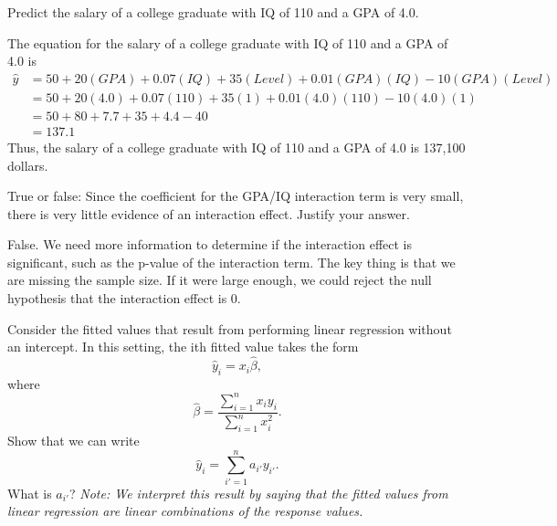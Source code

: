 \documentclass{article}
\begin{document}
\begin{probset}
\begin{prob}
\begin{subprobset}
        \begin{subprob}
            Predict the salary of a college graduate with IQ of 110 and a GPA of 4.0.

            \begin{soln}
                The equation for the salary of a college graduate with IQ of 110 and a GPA of 4.0 is
                \begin{align*}
                    \hat{y} &= 50 + 20(GPA) + 0.07(IQ) + 35(Level) + 0.01(GPA)(IQ) - 10(GPA)(Level) \\
                    &= 50 + 20(4.0) + 0.07(110) + 35(1) + 0.01(4.0)(110) - 10(4.0)(1) \\
                    &= 50 + 80 + 7.7 + 35 + 4.4 - 40 \\
                    &= 137.1
                \end{align*}
                Thus, the salary of a college graduate with IQ of 110 and a GPA of 4.0 is 137,100 dollars.
            \end{soln}
        \end{subprob}

        \begin{subprob}
            True or false: Since the coefficient for the GPA/IQ interaction term is very small, there is very little evidence of an interaction effect. Justify your answer.

            \begin{soln}
                False. We need more information to determine if the interaction effect is significant, such as the p-value of the interaction term. The key thing is that we are missing the sample size. If it were large enough, we could reject the null hypothesis that the interaction effect is 0.
            \end{soln}
        \end{subprob}
    \end{subprobset}
\end{prob}

\newpage

\begin{prob}
    Consider the fitted values that result from performing linear regression without an intercept. In this setting, the ith fitted value takes the form
    \[\hat{y}_i = x_i \hat{\beta},\]
    where
    \[\hat{\beta} = \frac{\sum_{i=1}^n x_i y_i}{\sum_{i=1}^n x_i^2}.\]
    Show that we can write
    \[\hat{y}_i = \sum_{i'=1}^n a_{i'} y_{i'}.\]
    What is $a_{i'}$? \textit{Note: We interpret this result by saying that the fitted values from linear regression are linear combinations of the response values.}


\end{prob}
\end{probset}
\end{document}
